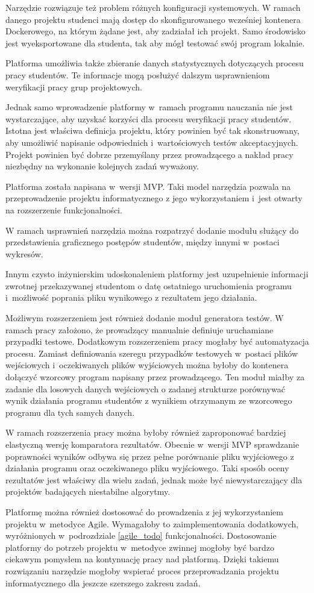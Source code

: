 Narzędzie rozwiązuje też problem różnych konfiguracji systemowych.
W ramach danego projektu studenci mają dostęp do skonfigurowanego wcześniej kontenera Dockerowego, na którym żądane jest, aby zadziałał ich projekt.
Samo środowisko jest wyeksportowane dla studenta, tak aby mógł testować swój program lokalnie.

Platforma umożliwia także zbieranie danych statystycznych dotyczących procesu pracy studentów.
Te informacje mogą posłużyć dalszym usprawnieniom weryfikacji pracy grup projektowych.

Jednak samo wprowadzenie platformy w~ramach programu nauczania nie jest wystarczające, aby uzyskać  korzyści dla procesu weryfikacji pracy studentów.
Istotna jest właściwa definicja projektu, który powinien być tak skonstruowany, aby umożliwić napisanie odpowiednich i~wartościowych testów akceptacyjnych.
Projekt powinien być dobrze przemyślany przez prowadzącego a nakład pracy niezbędny na wykonanie kolejnych zadań wyważony.

Platforma została napisana w~wersji MVP.
Taki model narzędzia pozwala na przeprowadzenie projektu informatycznego z jego wykorzystaniem i~jest otwarty na rozszerzenie funkcjonalności.

W ramach usprawnień narzędzia można rozpatrzyć dodanie modułu służący do przedstawienia graficznego postępów studentów, między innymi w~postaci wykresów.

Innym czysto inżynierskim udoskonaleniem platformy jest uzupełnienie informacji zwrotnej przekazywanej studentom o datę ostatniego uruchomienia programu i~możliwość poprania pliku wynikowego z rezultatem jego działania.

Możliwym rozszerzeniem jest również dodanie moduł generatora testów.
W ramach pracy założono, że prowadzący manualnie definiuje uruchamiane przypadki testowe.
Dodatkowym rozszerzeniem pracy mogłaby być automatyzacja procesu.
Zamiast definiowania szeregu przypadków testowych w~postaci plików wejściowych i~oczekiwanych plików wyjściowych można byłoby do kontenera dołączyć wzorcowy program napisany przez prowadzącego.
Ten moduł miałby za zadanie dla losowych danych wejściowych o zadanej strukturze porównywać wynik działania programu studentów z wynikiem otrzymanym ze wzorcowego programu dla tych samych danych.

W ramach rozszerzenia pracy można byłoby również zaproponować bardziej elastyczną wersję komparatora rezultatów.
Obecnie w~wersji MVP sprawdzanie poprawności wyników odbywa się przez pełne porównanie pliku wyjściowego z działania programu oraz oczekiwanego pliku wyjściowego.
Taki sposób oceny rezultatów jest właściwy dla wielu zadań, jednak może być niewystarczający dla projektów badających niestabilne algorytmy.

Platformę można również dostosować do prowadzenia z jej wykorzystaniem projektu w~metodyce Agile.
Wymagałoby to zaimplementowania dodatkowych, wyróżnionych w~podrozdziale \ref{agile_todo} funkcjonalności.
Dostosowanie platformy do potrzeb projektu w~metodyce zwinnej mogłoby być bardzo ciekawym pomysłem na kontynuację pracy nad platformą.
Dzięki takiemu rozwiązaniu narzędzie mogłoby wspierać proces przeprowadzania projektu informatycznego dla jeszcze szerszego zakresu zadań.